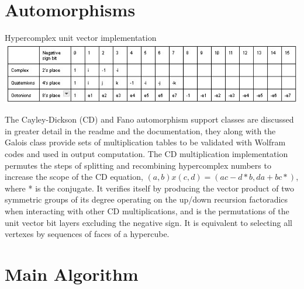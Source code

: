 \documentclass[11pt]{article}
\begin{document}
\section{Automorphisms}
\begin{center}
Hypercomplex unit vector implementation
\includegraphics{unitVectorChart.jpg}\\
\end{center}

The Cayley-Dickson (CD) and Fano automorphism support classes are discussed in greater detail in the readme and the documentation, they along with the Galois class provide sets of multiplication tables to be validated with Wolfram codes and used in output computation. The CD multiplication implementation permutes the steps of splitting and recombining hypercomplex numbers to increase the scope of the CD equation, $(a,b)x(c,d)=(ac-d*b,da+bc*)$, where * is the conjugate. It verifies itself by producing the vector product of two symmetric groups of its degree operating on the up/down recursion factoradics when interacting with other CD multiplications, and is the permutations of the unit vector bit layers excluding the negative sign.  It is equivalent to selecting all vertexes by sequences of faces of a hypercube.

\section{Main Algorithm}
\end{document}
